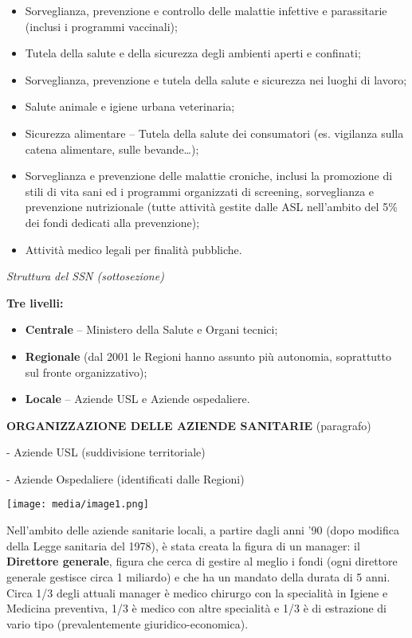 \documentclass[]{article}
\begin{document}
\begin{itemize}
\item
  Sorveglianza, prevenzione e controllo delle malattie infettive e
  parassitarie (inclusi i programmi vaccinali);
\item
  Tutela della salute e della sicurezza degli ambienti aperti e
  confinati;
\item
  Sorveglianza, prevenzione e tutela della salute e sicurezza nei luoghi
  di lavoro;
\item
  Salute animale e igiene urbana veterinaria;
\item
  Sicurezza alimentare -- Tutela della salute dei consumatori (es.
  vigilanza sulla catena alimentare, sulle bevande\ldots{});
\item
  Sorveglianza e prevenzione delle malattie croniche, inclusi la
  promozione di stili di vita sani ed i programmi organizzati di
  screening, sorveglianza e prevenzione nutrizionale (tutte attività
  gestite dalle ASL nell'ambito del 5\% dei fondi dedicati alla
  prevenzione);
\item
  Attività medico legali per finalità pubbliche.
\end{itemize}

\emph{Struttura del SSN (sottosezione)}

\textbf{Tre livelli:}

\begin{itemize}
\item
  \textbf{Centrale} -- Ministero della Salute e Organi tecnici;
\item
  \textbf{Regionale} (dal 2001 le Regioni hanno assunto più autonomia,
  soprattutto sul fronte organizzativo);
\item
  \textbf{Locale} -- Aziende USL e Aziende ospedaliere.
\end{itemize}

\textbf{ORGANIZZAZIONE DELLE AZIENDE SANITARIE} (paragrafo)

- Aziende USL (suddivisione territoriale)

- Aziende Ospedaliere (identificati dalle Regioni)

\texttt{[image: media/image1.png]}

Nell'ambito delle aziende sanitarie locali, a partire dagli anni '90
(dopo modifica della Legge sanitaria del 1978), è stata creata la figura
di un manager: il \textbf{Direttore generale}, figura che cerca di
gestire al meglio i fondi (ogni direttore generale gestisce circa 1
miliardo) e che ha un mandato della durata di 5 anni. Circa 1/3 degli
attuali manager è medico chirurgo con la specialità in Igiene e Medicina
preventiva, 1/3 è medico con altre specialità e 1/3 è di estrazione di
vario tipo (prevalentemente giuridico-economica).
\end{document}
